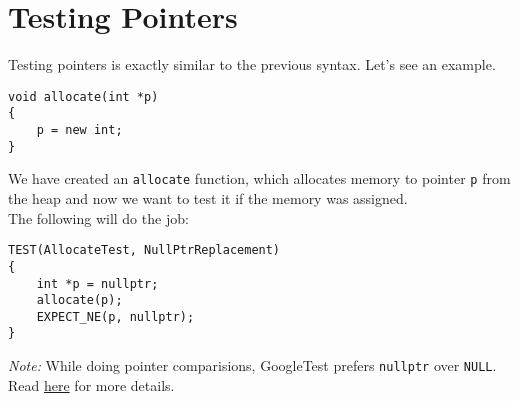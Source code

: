 \section{Testing Pointers}

Testing pointers is exactly similar to the previous syntax. Let's see an
example.

\begin{Verbatim}[frame=single]
void allocate(int *p)
{
    p = new int;
}
\end{Verbatim}

We have created an \verb!allocate! function, which allocates memory to
pointer \verb!p! from the heap and now we want to test it if the memory was
assigned. \\

The following will do the job:
\begin{Verbatim}[frame=single]
TEST(AllocateTest, NullPtrReplacement)
{
    int *p = nullptr;
    allocate(p);
    EXPECT_NE(p, nullptr);
}
\end{Verbatim}

\textit{Note: } While doing pointer comparisions, GoogleTest prefers
\verb!nullptr! over \verb!NULL!. Read
\href{https://github.com/google/googletest/blob/master/googletest/docs/faq.md}
     {here} for more details.
\newpage
